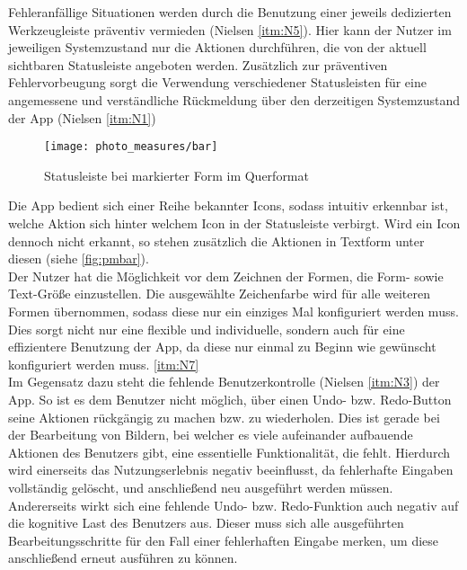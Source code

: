 Fehleranfällige Situationen werden durch die Benutzung einer jeweils dedizierten Werkzeugleiste präventiv vermieden (Nielsen \autoref{itm:N5}).
Hier kann der Nutzer im jeweiligen Systemzustand nur die Aktionen durchführen, die von der aktuell sichtbaren Statusleiste angeboten werden.
Zusätzlich zur präventiven Fehlervorbeugung sorgt die Verwendung verschiedener Statusleisten für eine angemessene und verständliche Rückmeldung über den derzeitigen Systemzustand der App (Nielsen \autoref{itm:N1}) \\

\begin{wrapfigure}{R}{0.4\textwidth}
  \centering
  \texttt{[image: photo\_measures/bar]}
  \caption{Statusleiste bei markierter Form im Querformat}
  \label{fig:pmbar}
\end{wrapfigure}

\noindent
Die App bedient sich einer Reihe bekannter Icons, sodass intuitiv erkennbar ist, welche Aktion sich hinter welchem Icon in der Statusleiste verbirgt.
Wird ein Icon dennoch nicht erkannt, so stehen zusätzlich die Aktionen in Textform unter diesen (siehe \autoref{fig:pmbar}). \\

Der Nutzer hat die Möglichkeit vor dem Zeichnen der Formen, die Form- sowie Text-Größe einzustellen.
Die ausgewählte Zeichenfarbe wird für alle weiteren Formen übernommen, sodass diese nur ein einziges Mal konfiguriert werden muss.
Dies sorgt nicht nur eine flexible und individuelle, sondern auch für eine effizientere Benutzung der App, da diese nur einmal zu Beginn wie gewünscht konfiguriert werden muss. \autoref{itm:N7} \\

Im Gegensatz dazu steht die fehlende Benutzerkontrolle (Nielsen \autoref{itm:N3}) der App.
So ist es dem Benutzer nicht möglich, über einen Undo- bzw. Redo-Button seine Aktionen rückgängig zu machen bzw. zu wiederholen.
Dies ist gerade bei der Bearbeitung von Bildern, bei welcher es viele aufeinander aufbauende Aktionen des Benutzers gibt, eine essentielle Funktionalität, die fehlt.
Hierdurch wird einerseits das Nutzungserlebnis negativ beeinflusst, da fehlerhafte Eingaben vollständig gelöscht, und anschließend neu ausgeführt werden müssen.
Andererseits wirkt sich eine fehlende Undo- bzw. Redo-Funktion auch negativ auf die kognitive Last des Benutzers aus.
Dieser muss sich alle ausgeführten Bearbeitungsschritte für den Fall einer fehlerhaften Eingabe merken, um diese anschließend erneut ausführen zu können. \\

